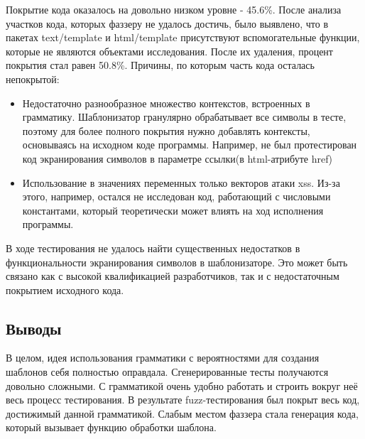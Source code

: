 \documentclass[a4paper]{article}
\begin{document}
Покрытие кода оказалось на довольно низком уровне - 45.6\%. После анализа участков кода, которых фаззеру не удалось достичь, было выявлено, что в пакетах text/template и html/template присутствуют вспомогательные функции, которые не являются объектами исследования. После их удаления, процент покрытия стал равен 50.8\%.
Причины, по которым часть кода осталась непокрытой:
\begin{itemize}
    \item Недостаточно разнообразное множество контекстов, встроенных в грамматику. Шаблонизатор гранулярно обрабатывает все символы в тесте, поэтому для более полного покрытия нужно добавлять контексты, основываясь на исходном коде программы. Например, не был протестирован код экранирования символов в параметре ссылки(в html-атрибуте href)
    \item Использование в значениях переменных только векторов атаки xss. Из-за этого, например, остался не исследован код, работающий с числовыми константами, который теоретически может влиять на ход исполнения программы.
\end{itemize}

В ходе тестирования не удалось найти существенных недостатков в функциональности экранирования символов в шаблонизаторе. Это может быть связано как с высокой квалификацией разработчиков, так и с недостаточным покрытием исходного кода.

 
\subsection{Выводы}

В целом, идея использования грамматики с вероятностями для создания шаблонов себя полностью оправдала. Сгенерированные тесты получаются довольно сложными. С грамматикой очень удобно работать и строить вокруг неё весь процесс тестирования. В результате fuzz-тестирования был покрыт весь код, достижимый данной грамматикой. Слабым местом фаззера стала генерация кода, который вызывает функцию обработки шаблона. 
\end{document}

